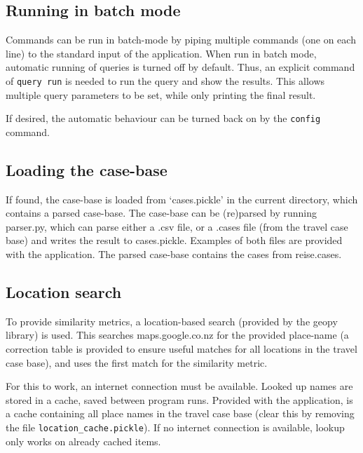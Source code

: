 \documentclass[a4paper,11pt]{scrartcl}
\begin{document}
\subsection{Running in batch mode}
Commands can be run in batch-mode by piping multiple commands (one on
each line) to the standard input of the application. When run in batch
mode, automatic running of queries is turned off by default. Thus, an
explicit command of \verb~query run~ is needed to run the query and
show the results. This allows multiple query parameters to be set,
while only printing the final result.

If desired, the automatic behaviour can be turned back on by the
\verb~config~ command.

\subsection{Loading the case-base}
If found, the case-base is loaded from `cases.pickle' in the current
directory, which contains a parsed case-base. The case-base can be
(re)parsed by running parser.py, which can parse either a .csv file,
or a .cases file (from the travel case base) and writes the result to
cases.pickle. Examples of both files are provided with the
application. The parsed case-base contains the cases from reise.cases.

\subsection{Location search}
To provide similarity metrics, a location-based search (provided by
the geopy library) is used. This searches maps.google.co.nz for the
provided place-name (a correction table is provided to ensure useful
matches for all locations in the travel case base), and uses the first
match for the similarity metric.

For this to work, an internet connection must be available. Looked up
names are stored in a cache, saved between program runs. Provided with
the application, is a cache containing all place names in the travel
case base (clear this by removing the file
\verb~location_cache.pickle~). If no internet connection is
available, lookup only works on already cached items.
\end{document}
